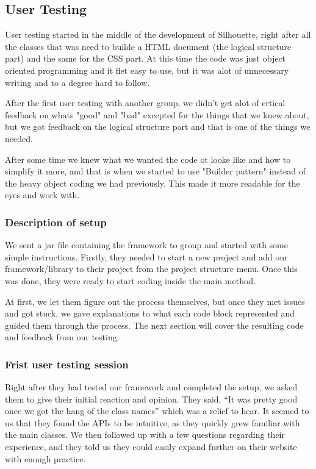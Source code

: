 \documentclass[12pt]{article}
\begin{document}
    \subsection{User Testing}
    User testing started in the middle of the development of Silhouette, right after all the classes that was need to builde a HTML document (the logical structure part) and the same for the CSS part. At this time the code was just object oriented programming and it flet easy to use, but it was alot of unnecessary writing and to a degree hard to follow.   
        
    After the first user testing with another group, we didn't get alot of crtical feedback on whats "good" and "bad" excepted for the things that we knew about, but we got feedback on the logical structure part and that is one of the things we needed.
        
    After some time we knew what we wanted the code ot looke like and how to simplify it more, and that is when we started to use "Builder pattern" instead of the heavy object coding we had previously. This made it more readable for the eyes and work with.

        \subsubsection{Description of setup}
        We sent a jar file containing the framework to group and started with some simple instructions. Firstly, they needed to start a new project and add our framework/library to their project from the project structure menu. Once this was done, they were ready to start coding inside the main method.
        
        At first, we let them figure out the process themselves, but once they met issues and got stuck, we gave explanations to what each code block represented and guided them through the process. The next section will cover the resulting code and feedback from our testing.

        \subsubsection{Frist user testing session}
        Right after they had tested our framework and completed the setup, we asked them to give their initial reaction and opinion. They said, “It was pretty good once we got the hang of the class names” which was a relief to hear. It seemed to us that they found the APIs to be intuitive, as they quickly grew familiar with the main classes. We then followed up with a few questions regarding their experience, and they told us they could easily expand further on their website with enough practice.
\end{document}
